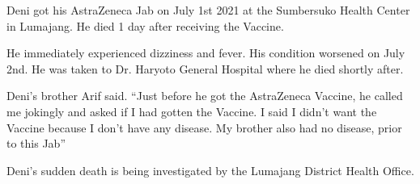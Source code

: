 Deni got his AstraZeneca Jab on July 1st 2021 at the Sumbersuko Health Center in
Lumajang. He died 1 day after receiving the Vaccine.

He immediately experienced dizziness and fever. His condition worsened on July
2nd. He was taken to Dr. Haryoto General Hospital where he died shortly after.

Deni’s brother Arif said. “Just before he got the AstraZeneca Vaccine, he called
me jokingly and asked if I had gotten the Vaccine. I said I didn’t want the
Vaccine because I don’t have any disease. My brother also had no disease, prior
to this Jab”

Deni’s sudden death is being investigated by the Lumajang District Health
Office.


